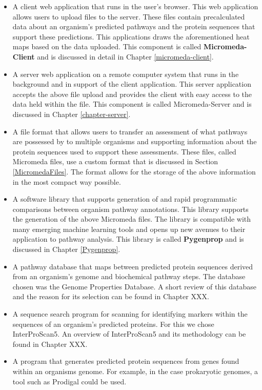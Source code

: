 \begin{itemize}
\item A client web application that runs in the user's browser. This web application allows users to upload files to the server. These files contain precalculated data about an organism's predicted pathways and the protein sequences that support these predictions. This applications draws the aforementioned heat maps based on the data uploaded.  This component is called \textbf{Micromeda-Client} and is discussed in detail in Chapter \ref{micromeda-client}.
\item A server web application on a remote computer system that runs in the background and in support of the client application. This server application accepts the above file upload and provides the client with easy access to the data held within the file. This component is called Micromeda-Server and is discussed in Chapter \ref{chapter-server}.
\item A file format that allows users to transfer an assessment of what pathways are possessed by to multiple organisms and supporting information about the protein sequences used to support these assessments. These files, called Micromeda files, use a custom format that is discussed in Section \ref{MicromedaFiles}. The format allows for the storage of the above information in the most compact way possible.
\item A software library that supports generation of and rapid programmatic comparisons between organism pathway annotations. This library supports the generation of the above Micromeda files. The library is compatible with many emerging machine learning tools and opens up new avenues to their application to pathway analysis. This library is called \textbf{Pygenprop} and is discussed in Chapter \ref{Pygenprop}.
\item A pathway database that maps between predicted protein sequences derived from an organism's genome and biochemical pathway steps. The database chosen was the Genome Properties Database. A short review of this database and the reason for its selection can be found in Chapter XXX.
\item A sequence search program for scanning for identifying markers within the sequences of an organism's predicted proteins. For this we chose InterProScan5. An overview of InterProScan5 and its methodology can be found in Chapter XXX.
\item A program that generates predicted protein sequences from genes found within an organisms genome. For example, in the case prokaryotic genomes, a tool such as Prodigal could be used. 
\end{itemize}

